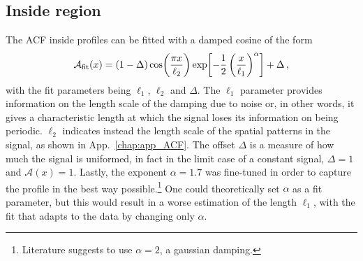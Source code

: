 \subsection{Inside region}
The ACF inside profiles can be fitted with a damped cosine of the form
\begin{equation}
    \mathcal{A}_{\rm fit}(x) = (1 - \Delta)\cos(\frac{\pi x}{\ell_2})\exp[-\frac{1}{2}\left(\frac{x}{\ell_1}\right)^\alpha] + \Delta\, ,
    \label{eq:damp}
\end{equation}
with the fit parameters being $\ell_1$, $\ell_2$ and $\Delta$. The $\ell_1$ parameter provides information on the length scale of the damping due to noise or, in other words, it gives a characteristic length at which the signal loses its information on being periodic. $\ell_2$ indicates instead the length scale of the spatial patterns in the signal, as shown in App.\ \ref{chap:app_ACF}. The offset $\Delta$ is a measure of how much the signal is uniformed, in fact in the limit case of a constant signal, $\Delta = 1$ and $\mathcal{A}(x) = 1$.
Lastly, the exponent $\alpha = 1.7$ was fine-tuned in order to capture the profile in the best way possible.\footnote{Literature suggests to use $\alpha = 2$, a gaussian damping.} One could theoretically set $\alpha$ as a fit parameter, but this would result in a worse estimation of the length $\ell_1$, with the fit that adapts to the data by changing only $\alpha$. 

